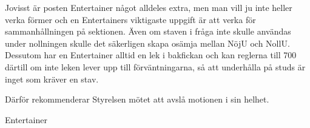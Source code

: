 \documentclass[../_main/handlingar.tex]{subfiles}
\begin{document}
\motionssvar

Jovisst är posten Entertainer något alldeles extra, men man vill ju inte heller verka förmer och en Entertainers viktigaste uppgift är att verka för sammanhållningen på sektionen. Även om staven i fråga inte skulle användas under nollningen skulle det säkerligen skapa osämja mellan NöjU och NollU. Dessutom har en Entertainer alltid en lek i bakfickan och kan reglerna till 700 därtill om inte leken lever upp till förväntningarna, så att underhålla på studs är inget som kräver en stav. 

Därför rekommenderar Styrelsen mötet att avslå motionen i sin helhet. 


\begin{signatures}{1}
    \ist
    \signature{\ent}{Entertainer}
\end{signatures}
\end{document}

